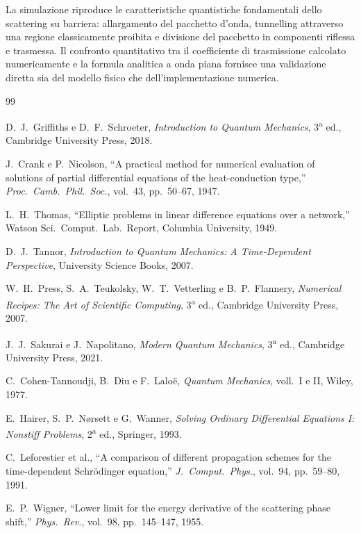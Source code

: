 \documentclass[12pt, a4paper]{article}
\begin{document}
La simulazione riproduce le caratteristiche quantistiche fondamentali
dello scattering su barriera: allargamento del pacchetto d'onda,
tunnelling attraverso una regione classicamente proibita e divisione
del pacchetto in componenti riflessa e trasmessa.  Il confronto
quantitativo tra il coefficiente di trasmissione calcolato
numericamente e la formula analitica a onda piana fornisce una
validazione diretta sia del modello fisico che dell'implementazione
numerica.

\clearpage

\begin{thebibliography}{99}

D.~J.~Griffiths e D.~F.~Schroeter,
\textit{Introduction to Quantum Mechanics}, 3\textsuperscript{a} ed.,
Cambridge University Press, 2018.

J.~Crank e P.~Nicolson,
``A practical method for numerical evaluation of solutions of partial
differential equations of the heat-conduction type,''
\textit{Proc.\ Camb.\ Phil.\ Soc.}, vol.~43, pp.~50--67, 1947.

L.~H.~Thomas,
``Elliptic problems in linear difference equations over a network,''
Watson Sci.\ Comput.\ Lab.\ Report, Columbia University, 1949.

D.~J.~Tannor,
\textit{Introduction to Quantum Mechanics: A Time-Dependent Perspective},
University Science Books, 2007.

W.~H.~Press, S.~A.~Teukolsky, W.~T.~Vetterling e B.~P.~Flannery,
\textit{Numerical Recipes: The Art of Scientific Computing},
3\textsuperscript{a} ed., Cambridge University Press, 2007.

J.~J.~Sakurai e J.~Napolitano,
\textit{Modern Quantum Mechanics}, 3\textsuperscript{a} ed.,
Cambridge University Press, 2021.

C.~Cohen-Tannoudji, B.~Diu e F.~Lalo\"{e},
\textit{Quantum Mechanics}, voll.~I e II,
Wiley, 1977.

E.~Hairer, S.~P.~N\o rsett e G.~Wanner,
\textit{Solving Ordinary Differential Equations I: Nonstiff Problems},
2\textsuperscript{a} ed., Springer, 1993.

C.~Leforestier et al.,
``A comparison of different propagation schemes for the time-dependent
Schr\"{o}dinger equation,''
\textit{J.\ Comput.\ Phys.}, vol.~94, pp.~59--80, 1991.

E.~P.~Wigner,
``Lower limit for the energy derivative of the scattering phase shift,''
\textit{Phys.\ Rev.}, vol.~98, pp.~145--147, 1955.

\end{thebibliography}
\end{document}
